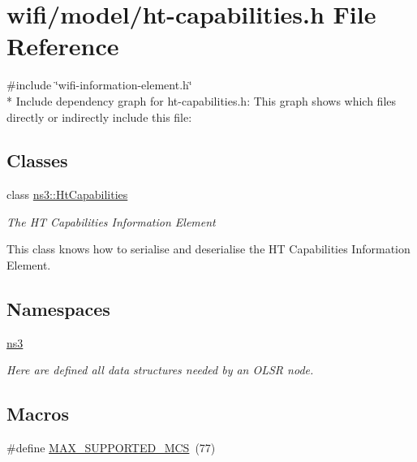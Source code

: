 \hypertarget{ht-capabilities_8h}{}\section{wifi/model/ht-\/capabilities.h File Reference}
\label{ht-capabilities_8h}
{\ttfamily \#include \char`\"{}wifi-\/information-\/element.\+h\char`\"{}}\\*
Include dependency graph for ht-\/capabilities.h\+:
This graph shows which files directly or indirectly include this file\+:
\subsection*{Classes}
\begin{DoxyCompactItemize}
\item 
class \hyperlink{classns3_1_1HtCapabilities}{ns3\+::\+Ht\+Capabilities}
\begin{DoxyCompactList}\small\item\em The HT Capabilities Information Element

This class knows how to serialise and deserialise the HT Capabilities Information Element. \end{DoxyCompactList}\end{DoxyCompactItemize}
\subsection*{Namespaces}
\begin{DoxyCompactItemize}
\item 
 \hyperlink{namespacens3}{ns3}
\begin{DoxyCompactList}\small\item\em Here are defined all data structures needed by an O\+L\+SR node. \end{DoxyCompactList}\end{DoxyCompactItemize}
\subsection*{Macros}
\begin{DoxyCompactItemize}
\item 
\#define \hyperlink{ht-capabilities_8h_a309e0519adb78c8fe6aed48ca762e21e}{M\+A\+X\+\_\+\+S\+U\+P\+P\+O\+R\+T\+E\+D\+\_\+\+M\+CS}~(77)
\end{DoxyCompactItemize}
